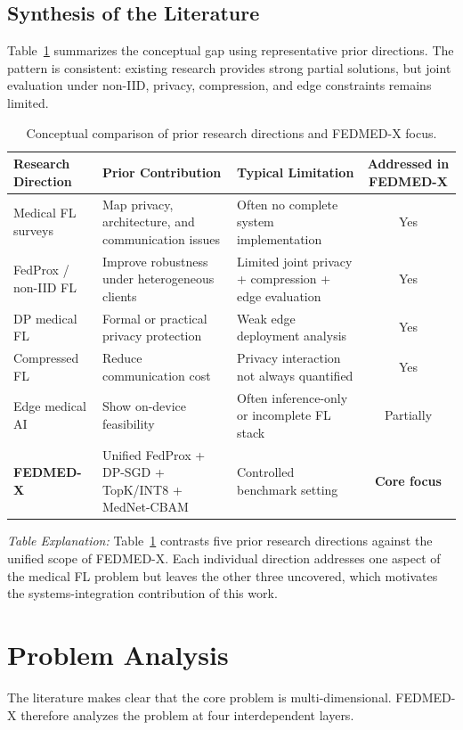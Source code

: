 \subsection{Synthesis of the Literature}
Table~\ref{tab:litgap} summarizes the conceptual gap using representative
prior directions. The pattern is consistent: existing research provides
strong partial solutions, but joint evaluation under non-IID, privacy,
compression, and edge constraints remains limited.

\begin{table}[!htbp]
\centering
\caption{Conceptual comparison of prior research directions and FEDMED-X focus.}
\label{tab:litgap}
\small
\begin{tabularx}{\textwidth}{@{}l X X c@{}}
\toprule
\textbf{Research Direction} & \textbf{Prior Contribution} & \textbf{Typical Limitation} & \textbf{Addressed in FEDMED-X} \\
\midrule
Medical FL surveys        & Map privacy, architecture, and communication issues       & Often no complete system implementation & Yes \\
FedProx / non-IID FL      & Improve robustness under heterogeneous clients            & Limited joint privacy + compression + edge evaluation & Yes \\
DP medical FL             & Formal or practical privacy protection                    & Weak edge deployment analysis            & Yes \\
Compressed FL             & Reduce communication cost                                 & Privacy interaction not always quantified & Yes \\
Edge medical AI           & Show on-device feasibility                                & Often inference-only or incomplete FL stack & Partially \\
\textbf{FEDMED-X}         & Unified FedProx + DP-SGD + TopK/INT8 + MedNet-CBAM        & Controlled benchmark setting             & \textbf{Core focus} \\
\bottomrule
\end{tabularx}
\end{table}

\noindent\emph{Table Explanation:} Table~\ref{tab:litgap} contrasts five
prior research directions against the unified scope of FEDMED-X. Each
individual direction addresses one aspect of the medical FL problem but
leaves the other three uncovered, which motivates the systems-integration
contribution of this work.
\FloatBarrier

\section{Problem Analysis}
The literature makes clear that the core problem is multi-dimensional.
FEDMED-X therefore analyzes the problem at four interdependent layers.

